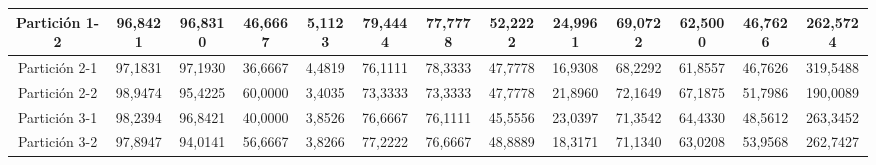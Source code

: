 \documentclass[12pt]{article}
\begin{document}
\begin{table}[H]
{\begin{tabular}{|c|cccc|cccc|cccc|}
Partición 1-2 & \multicolumn{1}{c|}{96,8421}                                                  & \multicolumn{1}{c|}{96,8310}                                                 & \multicolumn{1}{c|}{46,6667} & 5,1123 & \multicolumn{1}{c|}{79,4444}                                                  & \multicolumn{1}{c|}{77,7778}       & \multicolumn{1}{c|}{52,2222} & 24,9961 & \multicolumn{1}{c|}{69,0722}                                                  & \multicolumn{1}{c|}{62,5000}                                                 & \multicolumn{1}{c|}{46,7626} & 262,5724 \\ \hline
Partición 2-1 & \multicolumn{1}{c|}{97,1831}                                                  & \multicolumn{1}{c|}{97,1930}                                                 & \multicolumn{1}{c|}{36,6667} & 4,4819 & \multicolumn{1}{c|}{76,1111}                                                  & \multicolumn{1}{c|}{78,3333}       & \multicolumn{1}{c|}{47,7778} & 16,9308 & \multicolumn{1}{c|}{68,2292}                                                  & \multicolumn{1}{c|}{61,8557}                                                 & \multicolumn{1}{c|}{46,7626} & 319,5488 \\ \hline
Partición 2-2 & \multicolumn{1}{c|}{98,9474}                                                  & \multicolumn{1}{c|}{95,4225}                                                 & \multicolumn{1}{c|}{60,0000} & 3,4035 & \multicolumn{1}{c|}{73,3333}                                                  & \multicolumn{1}{c|}{73,3333}       & \multicolumn{1}{c|}{47,7778} & 21,8960 & \multicolumn{1}{c|}{72,1649}                                                  & \multicolumn{1}{c|}{67,1875}                                                 & \multicolumn{1}{c|}{51,7986} & 190,0089 \\ \hline
Partición 3-1 & \multicolumn{1}{c|}{98,2394}                                                  & \multicolumn{1}{c|}{96,8421}                                                 & \multicolumn{1}{c|}{40,0000} & 3,8526 & \multicolumn{1}{c|}{76,6667}                                                  & \multicolumn{1}{c|}{76,1111}       & \multicolumn{1}{c|}{45,5556} & 23,0397 & \multicolumn{1}{c|}{71,3542}                                                  & \multicolumn{1}{c|}{64,4330}                                                 & \multicolumn{1}{c|}{48,5612} & 263,3452 \\ \hline
Partición 3-2 & \multicolumn{1}{c|}{97,8947}                                                  & \multicolumn{1}{c|}{94,0141}                                                 & \multicolumn{1}{c|}{56,6667} & 3,8266 & \multicolumn{1}{c|}{77,2222}                                                  & \multicolumn{1}{c|}{76,6667}       & \multicolumn{1}{c|}{48,8889} & 18,3171 & \multicolumn{1}{c|}{71,1340}                                                  & \multicolumn{1}{c|}{63,0208}                                                 & \multicolumn{1}{c|}{53,9568} & 262,7427 \\ \hline

\end{tabular}}
\end{table}
\end{document}
